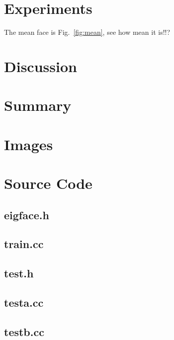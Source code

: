 \section{Experiments}
The mean face is Fig.~\ref{fig:mean}, see how mean it is!!?
\section{Discussion}
\section{Summary}

\newpage

\section{Images}



\clearpage

\section{Source Code}
  \subsection{eigface.h}
    
  \subsection{train.cc}
    
  \subsection{test.h}
    
  \subsection{testa.cc}
    
  \subsection{testb.cc}
    

